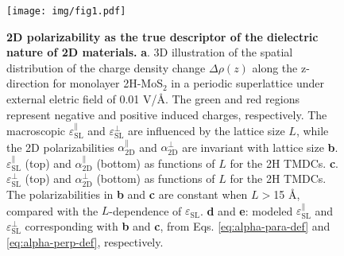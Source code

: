 \documentclass[journal=ancac3,manuscript=article,email=true,hyperref=true,keywords=false]{achemso}
\begin{document}
\label{sec:org34cbe74}
\begin{figure}[H]
\centering
\texttt{[image: img/fig1.pdf]}
\caption{\label{fig-1} \textbf{2D polarizability as the true
    descriptor of the dielectric nature of 2D materials.}
  \textbf{a}. 3D illustration of the spatial distribution of the
  charge density change $\Delta \rho(z)$ along the z-direction for
  monolayer 2H-MoS$_{2}$ in a periodic superlattice under external
  eletric field of 0.01 V/\AA{}.  The green and red regions represent
  negative and positive induced charges, respectively. The macroscopic
  $\varepsilon_{\mathrm{SL}}^{\parallel}$ and
  $\varepsilon_{\mathrm{SL}}^{\perp}$ are influenced by the lattice
  size $L$, while the 2D polarizabilities $\alpha_{\mathrm{2D}}^{\parallel}$ and
  $\alpha_{\mathrm{2D}}^{\perp}$ are invariant with lattice size \textbf{b}.
  $\varepsilon^{\parallel}_{\mathrm{SL}}$ (top) and
  $\alpha_{\mathrm{2D}}^{\parallel}$ (bottom) as functions of $L$ for
  the 2H TMDCs. \textbf{c}.  $\varepsilon^{\perp}_{\mathrm{SL}}$ (top)
  and $\alpha_{\mathrm{2D}}^{\perp}$ (bottom) as functions of $L$ for
  the 2H TMDCs. The polarizabilities in \textbf{b} and \textbf{c} are
  constant when $L>$15 \AA{}, compared with the $L$-dependence of
  $\varepsilon_{\mathrm{SL}}$. \textbf{d} and \textbf{e}: modeled
  $\varepsilon_{\mathrm{SL}}^{\parallel}$ and
  $\varepsilon_{\mathrm{SL}}^{\perp}$ corresponding with \textbf{b}
  and \textbf{c}, from Eqs. \ref{eq:alpha-para-def} and
  \ref{eq:alpha-perp-def}, respectively.}
\end{figure}

\end{document}
